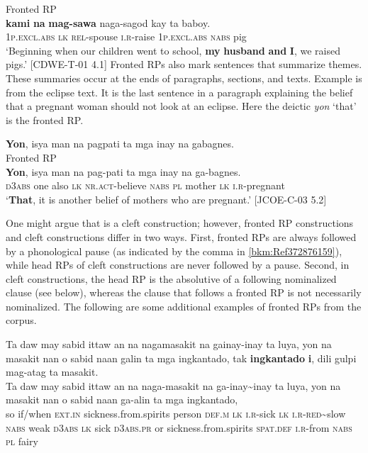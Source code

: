 Fronted RP \\
\gll \textbf{kami}  \textbf{na}  \textbf{mag-sawa}  naga-sagod  kay  ta  baboy. \\
1\textsc{p.excl.abs}  \textsc{lk}  \textsc{rel}-spouse  \textsc{i.r}-raise  1\textsc{p.excl.abs}  \textsc{nabs}  pig \\
\glt `Beginning when our children went to school, \textbf{my} \textbf{husband} \textbf{and} \textbf{I}, we raised  pigs.’ [CDWE-T-01 4.1]
\z
Fronted RPs also mark sentences that summarize themes. These summaries occur at the ends of paragraphs, sections, and texts. Example  is from the eclipse text. It is the last sentence in a paragraph explaining the belief that a pregnant woman should not look at an eclipse. Here the deictic \textit{yon} ‘that’ is the fronted RP.

\ea 
\label{bkm:Ref372876159}
\textbf{Yon},  isya  man  na  pagpati  ta  mga  inay  na  gabagnes. \\\smallskip
Fronted RP \\
\gll \textbf{Yon},  isya  man  na  pag-pati  ta  mga  inay  na  ga-bagnes. \\
\textsc{d}3\textsc{abs}  one  also  \textsc{lk}  \textsc{nr.act}-believe  \textsc{nabs}  \textsc{pl}  mother  \textsc{lk}  \textsc{i.r}-pregnant \\
\glt ‘\textbf{That}, it is another belief of mothers who are pregnant.’ [JCOE-C-03 5.2]
\z

One might argue that  is a cleft construction; however, fronted RP constructions and cleft constructions differ in two ways. First, fronted RPs are always followed by a phonological pause (as indicated by the comma in \ref{bkm:Ref372876159}), while head RPs of cleft constructions are never followed by a pause. Second, in cleft constructions, the head RP is the absolutive of a following nominalized clause (see  below),  whereas the clause that follows a fronted RP is not necessarily nominalized. The following are some additional examples of fronted RPs from the corpus.
\ea 

Ta  daw  may  sabid  ittaw  an  na  nagamasakit  na gainay-inay  ta  luya,  yon  na  masakit  nan  o  sabid naan  galin  ta  mga  ingkantado,  tak \textbf{ingkantado}  \textbf{i},  dili  gulpi  mag-atag  ta  masakit. \\\smallskip
\gll Ta  daw  may  sabid  ittaw  an  na  naga-masakit\footnotemark{}  na ga-inay\sim inay  ta  luya,  yon  na  masakit  nan  o  sabid naan  ga-alin  ta  mga  ingkantado, \\
so  if/when  \textsc{ext.in}  sickness.from.spirits  person  \textsc{def.m}  \textsc{lk}  \textsc{i.r}-sick  \textsc{lk}
\textsc{i.r}-\textsc{red}\sim slow  \textsc{nabs}  weak  \textsc{d}3\textsc{abs}  \textsc{lk}  sick  \textsc{d}3\textsc{abs.pr}  or  sickness.from.spirits \textsc{spat.def}  \textsc{i.r}-from  \textsc{nabs}  \textsc{pl}  fairy \\\smallskip
 {}


